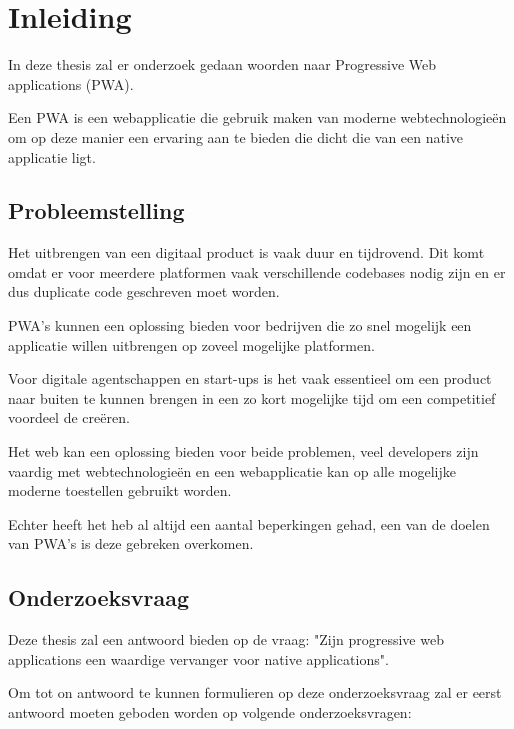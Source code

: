 
\chapter{Inleiding}
\label{ch:inleiding}

In deze thesis zal er onderzoek gedaan woorden naar Progressive Web applications (PWA).

Een PWA is een webapplicatie die gebruik maken van moderne webtechnologieën om op deze manier een ervaring aan te bieden die dicht die van een native applicatie ligt.

\section{Probleemstelling}

	Het uitbrengen van een digitaal product is vaak duur en tijdrovend. Dit komt omdat er voor meerdere platformen vaak verschillende codebases nodig zijn en er dus duplicate code geschreven moet worden. 
	
	PWA's kunnen een oplossing bieden voor bedrijven die zo snel mogelijk een applicatie willen uitbrengen op zoveel mogelijke platformen.
	
	Voor digitale agentschappen en start-ups is het vaak essentieel om een product naar buiten te kunnen brengen in een zo kort mogelijke tijd om een competitief voordeel de creëren. 
	
	Het web kan een oplossing bieden voor beide problemen, veel developers zijn vaardig met webtechnologieën en een webapplicatie kan op alle mogelijke moderne toestellen gebruikt worden. 
	
	Echter heeft het heb al altijd een aantal beperkingen gehad, een van de doelen van PWA's is deze gebreken overkomen.


\section{Onderzoeksvraag}


	Deze thesis zal een antwoord bieden op de vraag: "Zijn progressive web applications een waardige vervanger voor native applications".
	
	Om tot on antwoord  te kunnen formulieren op deze onderzoeksvraag zal er eerst antwoord moeten geboden worden op volgende onderzoeksvragen:
	

